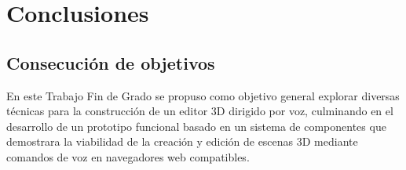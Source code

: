 \documentclass[a4paper, 12pt]{book}
\let\cleardoublepage\clearpage
\begin{document}
\cleardoublepage
\chapter{Conclusiones}
\label{chap:conclusiones}

\section{Consecución de objetivos}
\label{sec:consecucion-objetivos}

En este Trabajo Fin de Grado se propuso como objetivo general explorar diversas técnicas para la construcción de un editor 3D dirigido por voz,
culminando en el desarrollo de un prototipo funcional basado en un sistema de componentes que demostrara la viabilidad de la creación y edición de escenas 3D mediante comandos de voz en navegadores web compatibles.
\end{document}
